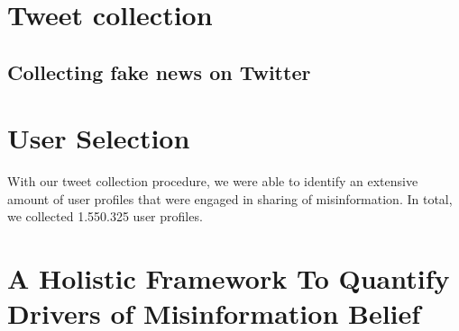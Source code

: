 \documentclass[
10pt, %
a4paper, %
oneside, %
headinclude,footinclude, %
] {book}%
\begin{document}
\section{Tweet collection}
\label{sec:tweet_collection}


\subsection{Collecting fake news on Twitter}



\section{User Selection}

With our tweet collection procedure, we were able to identify an extensive amount of user profiles that were engaged in sharing of misinformation. In total, we collected 1.550.325 user profiles.




\section{A Holistic Framework To Quantify Drivers of Misinformation Belief} 
\end{document}
